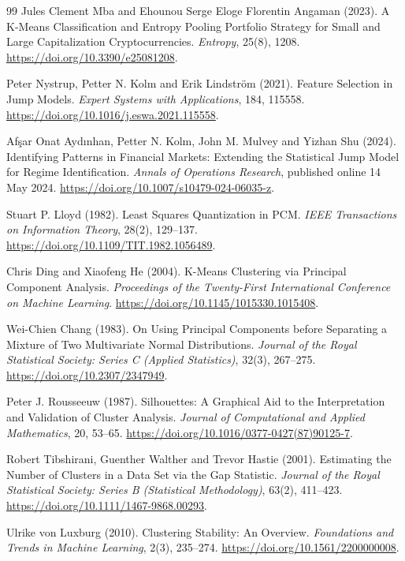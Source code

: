 \documentclass[11pt,a4paper]{article}
\begin{document}
\begin{thebibliography}{99}
Jules Clement Mba and Ehounou Serge Eloge Florentin Angaman (2023).
A K-Means Classification and Entropy Pooling Portfolio Strategy for Small and Large Capitalization Cryptocurrencies.
\emph{Entropy}, 25(8), 1208.
\url{https://doi.org/10.3390/e25081208}.

Peter Nystrup, Petter N. Kolm and Erik Lindstr\"om (2021).
Feature Selection in Jump Models.
\emph{Expert Systems with Applications}, 184, 115558.
\url{https://doi.org/10.1016/j.eswa.2021.115558}.

Af\c{s}ar Onat Ayd{\i}nhan, Petter N. Kolm, John M. Mulvey and Yizhan Shu (2024).
Identifying Patterns in Financial Markets: Extending the Statistical Jump Model for Regime Identification.
\emph{Annals of Operations Research}, published online 14 May 2024.
\url{https://doi.org/10.1007/s10479-024-06035-z}.

Stuart P. Lloyd (1982).
Least Squares Quantization in PCM.
\emph{IEEE Transactions on Information Theory}, 28(2), 129--137.
\url{https://doi.org/10.1109/TIT.1982.1056489}.

Chris Ding and Xiaofeng He (2004).
K-Means Clustering via Principal Component Analysis.
\emph{Proceedings of the Twenty-First International Conference on Machine Learning}.
\url{https://doi.org/10.1145/1015330.1015408}.

Wei-Chien Chang (1983).
On Using Principal Components before Separating a Mixture of Two Multivariate Normal Distributions.
\emph{Journal of the Royal Statistical Society: Series C (Applied Statistics)}, 32(3), 267--275.
\url{https://doi.org/10.2307/2347949}.

Peter J. Rousseeuw (1987).
Silhouettes: A Graphical Aid to the Interpretation and Validation of Cluster Analysis.
\emph{Journal of Computational and Applied Mathematics}, 20, 53--65.
\url{https://doi.org/10.1016/0377-0427(87)90125-7}.

Robert Tibshirani, Guenther Walther and Trevor Hastie (2001).
Estimating the Number of Clusters in a Data Set via the Gap Statistic.
\emph{Journal of the Royal Statistical Society: Series B (Statistical Methodology)}, 63(2), 411--423.
\url{https://doi.org/10.1111/1467-9868.00293}.

Ulrike von Luxburg (2010).
Clustering Stability: An Overview.
\emph{Foundations and Trends in Machine Learning}, 2(3), 235--274.
\url{https://doi.org/10.1561/2200000008}.


\end{thebibliography}
\end{document}
